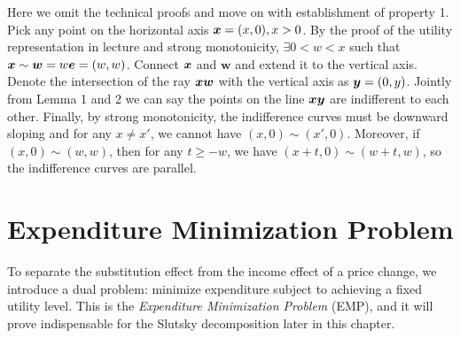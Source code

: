 {\begin{enumerate}
  Here we omit the technical proofs and move on with establishment of
  property 1. Pick any point on the horizontal axis \(\bm x = (x,0), x>0\).
  By the proof of the utility representation in lecture and strong
  monotonicity, \(\exists 0<w<x\) such that
  \(\bm x\sim \boldsymbol w = w\boldsymbol e = (w,w)\). Connect \(\bm x\) and
  \(\boldsymbol w\) and extend it to the vertical axis. Denote the
  intersection of the ray \(\bm x\boldsymbol w\) with the vertical axis as
  \(\bm y = (0,y)\). Jointly from Lemma 1 and 2 we can say the points on
  the line \(\bm x\bm y\) are indifferent to each other. Finally, by strong
  monotonicity, the indifference curves must be downward sloping and for
  any \(x\ne x'\), we cannot have \((x,0)\sim (x',0)\). Moreover, if
  \((x,0)\sim (w,w)\), then for any \(t\ge -w\), we have
  \((x+t,0)\sim (w+t,w)\), so the indifference curves are parallel.
\end{enumerate}
}

\section{Expenditure Minimization Problem}\label{expenditure-minimization-problem}

To separate the substitution effect from the income effect of a price
change, we introduce a dual problem: minimize expenditure subject to
achieving a fixed utility level. This is the \emph{Expenditure
Minimization Problem} (EMP), and it will prove indispensable for the
Slutsky decomposition later in this chapter.




